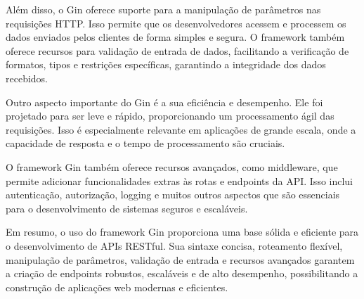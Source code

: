 Além disso, o Gin oferece suporte para a manipulação de parâmetros nas requisições HTTP. Isso permite que os desenvolvedores acessem e processem os dados enviados pelos clientes de forma simples e segura. O framework também oferece recursos para validação de entrada de dados, facilitando a verificação de formatos, tipos e restrições específicas, garantindo a integridade dos dados recebidos.

Outro aspecto importante do Gin é a sua eficiência e desempenho. Ele foi projetado para ser leve e rápido, proporcionando um processamento ágil das requisições. Isso é especialmente relevante em aplicações de grande escala, onde a capacidade de resposta e o tempo de processamento são cruciais.

O framework Gin também oferece recursos avançados, como middleware, que permite adicionar funcionalidades extras às rotas e endpoints da API. Isso inclui autenticação, autorização, logging e muitos outros aspectos que são essenciais para o desenvolvimento de sistemas seguros e escaláveis.

Em resumo, o uso do framework Gin proporciona uma base sólida e eficiente para o desenvolvimento de APIs RESTful. Sua sintaxe concisa, roteamento flexível, manipulação de parâmetros, validação de entrada e recursos avançados garantem a criação de endpoints robustos, escaláveis e de alto desempenho, possibilitando a construção de aplicações web modernas e eficientes.


